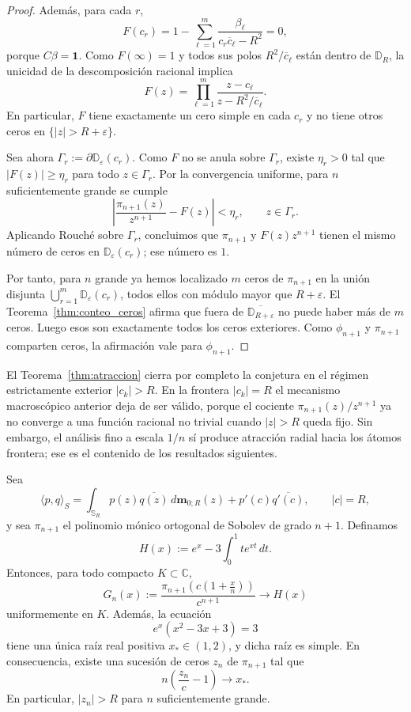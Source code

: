 \begin{proof}
	Además, para cada $r$,
	\[
		F(c_r)=1-\sum_{\ell=1}^m\frac{\beta_\ell}{c_r\overline c_\ell-R^2}=0,
	\]
	porque $C\beta=\mathbf 1$. Como $F(\infty)=1$ y todos sus polos $R^2/\overline c_\ell$ están dentro de $\mathbb D_R$, la unicidad de la descomposición racional implica
	\[
		F(z)=\prod_{\ell=1}^m\frac{z-c_\ell}{z-R^2/\overline c_\ell}.
	\]
	En particular, $F$ tiene exactamente un cero simple en cada $c_r$ y no tiene otros ceros en $\{|z|>R+\varepsilon\}$.

	Sea ahora $\Gamma_r:=\partial\mathbb D_\varepsilon(c_r)$. Como $F$ no se anula sobre $\Gamma_r$, existe $\eta_r>0$ tal que $|F(z)|\ge\eta_r$ para todo $z\in\Gamma_r$. Por la convergencia uniforme, para $n$ suficientemente grande se cumple
	\[
		\left|\frac{\pi_{n+1}(z)}{z^{n+1}}-F(z)\right|<\eta_r,
		\qquad z\in\Gamma_r.
	\]
	Aplicando Rouché sobre $\Gamma_r$, concluimos que $\pi_{n+1}$ y $F(z)z^{n+1}$ tienen el mismo número de ceros en $\mathbb D_\varepsilon(c_r)$; ese número es $1$.

	Por tanto, para $n$ grande ya hemos localizado $m$ ceros de $\pi_{n+1}$ en la unión disjunta $\bigcup_{r=1}^m\mathbb D_\varepsilon(c_r)$, todos ellos con módulo mayor que $R+\varepsilon$. El Teorema~\ref{thm:conteo_ceros} afirma que fuera de $\overline{\mathbb D_{R+\varepsilon}}$ no puede haber más de $m$ ceros. Luego esos son exactamente todos los ceros exteriores. Como $\phi_{n+1}$ y $\pi_{n+1}$ comparten ceros, la afirmación vale para $\phi_{n+1}$.
\end{proof}

\begin{rmk}\label{rem:alcance_atraccion}
	El Teorema~\ref{thm:atraccion} cierra por completo la conjetura en el régimen estrictamente exterior $|c_k|>R$. En la frontera $|c_k|=R$ el mecanismo macroscópico anterior deja de ser válido, porque el cociente $\pi_{n+1}(z)/z^{n+1}$ ya no converge a una función racional no trivial cuando $|z|>R$ queda fijo. Sin embargo, el análisis fino a escala $1/n$ sí produce atracción radial hacia los átomos frontera; ese es el contenido de los resultados siguientes.
\end{rmk}

\begin{lem}\label{lem:atomo_frontera_escala_n}
	Sea
	\[
		\langle p,q\rangle_S
		=
		\int_{\mathbb S_R}p(z)\overline{q(z)}\,d\mathbf m_{0;R}(z)
		+
		p'(c)\overline{q'(c)},
		\qquad |c|=R,
	\]
	y sea $\pi_{n+1}$ el polinomio mónico ortogonal de Sobolev de grado $n+1$. Definamos
	\[
		H(x):=e^x-3\int_0^1 t e^{xt}\,dt.
	\]
	Entonces, para todo compacto $K\subset\mathbb C$,
	\[
		G_n(x):=\frac{\pi_{n+1}\!\left(c\left(1+\frac{x}{n}\right)\right)}{c^{n+1}}
		\longrightarrow H(x)
	\]
	uniformemente en $K$. Además, la ecuación
	\[
		e^x(x^2-3x+3)=3
	\]
	tiene una única raíz real positiva $x_*\in(1,2)$, y dicha raíz es simple. En consecuencia, existe una sucesión de ceros $z_n$ de $\pi_{n+1}$ tal que
	\[
		n\left(\frac{z_n}{c}-1\right)\longrightarrow x_*.
	\]
	En particular, $|z_n|>R$ para $n$ suficientemente grande.
\end{lem}

